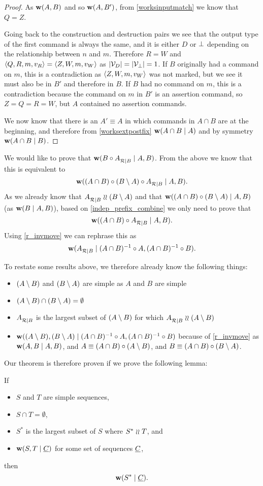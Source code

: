 \begin{proof}
As $\mathbf{w}({A,B})$ and so $\mathbf{w}({A,B'})$, 
from \cref{worksinputmatch}
we know that $Q=Z$. 

Going back to the construction and destruction pairs we see that the output type of the first command
is always the same, and it is either $D$ or $\bot$ depending on the relationship between $n$ and $m$.
Therefore $R=W$ and $\langle{Q,R,m,v_R}\rangle=\langle{Z,W,m,v_W}\rangle$
as $|\mathcal{V}_{D}|=|\mathcal{V}_{\bot}|=1$. 
If $B$ originally had a command on $m$,
this is a contradiction as $\langle{Z,W,m,v_W}\rangle$ was not marked, but we see it must also be in $B'$ and therefore in $B$.
If $B$ had no command on $m$,
this is a contradiction because the command on $m$ in $B'$ is an assertion command, so $Z=Q=R=W$, 
but $A$ contained no assertion commands.

\medskip

We now know that there is an $A'\equiv A$ in which commands in $A\cap B$
are at the beginning, and therefore 
from \cref{worksextpostfix}
$\mathbf{w}({A\cap B}\mathrel{|}{A})$ and by symmetry $\mathbf{w}({A\cap B}\mathrel{|}{B})$.
\end{proof}

\medskip


We would like to prove that $\mathbf{w}({B\circ {A}^{}_{\mathcal{R}|{B}}}\mathrel{|}{A,B})$.
From the above we know that this is equivalent to
\[ \mathbf{w}({(A\cap B)\circ (B\setminus A)\circ {A}^{}_{\mathcal{R}|{B}}}\mathrel{|}{A,B}). \]
As we already know that ${A}^{}_{\mathcal{R}|{B}}\mathrel{\wr\wr}(B\setminus A)$
and that $\mathbf{w}({(A\cap B)\circ (B\setminus A)}\mathrel{|}{A,B})$
(as $\mathbf{w}({B}\mathrel{|}{A,B})$),
based on \cref{indep_prefix_combine}
we only need to prove that
\[ \mathbf{w}({(A\cap B)\circ {A}^{}_{\mathcal{R}|{B}}}\mathrel{|}{A,B}). \]
Using \cref{r_invmove} we can rephrase this as
\[ \mathbf{w}({{A}^{}_{\mathcal{R}|{B}}}\mathrel{|}{(A\cap B)^{-1}\circ A,(A\cap B)^{-1}\circ B}). \]

To restate some results above, we therefore already know the following things:
\begin{itemize}
\item $(A\setminus B)$ and $(B\setminus A)$ are simple as $A$ and $B$ are simple
\item $(A\setminus B) \cap (B\setminus A) = \emptyset$
\item ${A}^{}_{\mathcal{R}|{B}}$ is the largest subset of $(A\setminus B)$ for which ${A}^{}_{\mathcal{R}|{B}}\mathrel{\wr\wr}(A\setminus B)$
\item $\mathbf{w}({(A\setminus B), (B\setminus A)}\mathrel{|}{(A\cap B)^{-1}\circ A,(A\cap B)^{-1}\circ B})$ 
because of \cref{r_invmove}
as $\mathbf{w}({A,B}\mathrel{|}{A,B})$,
and $A\equiv(A\cap B)\circ(A\setminus B)$, and $B\equiv(A\cap B)\circ(B\setminus A)$.
\end{itemize}

Our theorem is therefore proven if we prove the following lemma:
\newcommand{\condSimple}{(c1)}
\newcommand{\condDisj}{(c2)}
\newcommand{\condApr}{(c3)}
\newcommand{\condWork}{(c4)}
\begin{mylem}
If
   \begin{itemize}
   \item[\condSimple] $S$ and $T$ are simple sequences,
   \item[\condDisj] $S\cap T=\emptyset$,
   \item[\condApr] $S^*$ is the largest subset of $S$ where $S^*\mathrel{\wr\wr} T$, and
   \item[\condWork] $\mathbf{w}({S,T}\mathrel{|}{\underline{C}})$ for some set of sequences $\underline{C}$,
   \end{itemize}
then
\[ \mathbf{w}({S^*}\mathrel{|}{\underline{C}}). \]
\end{mylem}

